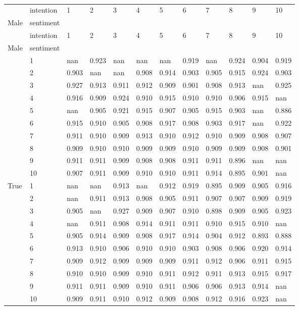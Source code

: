 \documentclass[
  letterpaper,
  DIV=11,
  numbers=noendperiod]{scrartcl}
\begin{document}
\begin{longtable}[]{@{}llllllllllll@{}}
\caption{}\label{T_ff72d}\tabularnewline
\toprule\noalign{}
~ & intention & 1 & 2 & 3 & 4 & 5 & 6 & 7 & 8 & 9 & 10 \\
Male & sentiment & ~ & ~ & ~ & ~ & ~ & ~ & ~ & ~ & ~ & ~ \\
\midrule\noalign{}
\endfirsthead
\toprule\noalign{}
~ & intention & 1 & 2 & 3 & 4 & 5 & 6 & 7 & 8 & 9 & 10 \\
Male & sentiment & ~ & ~ & ~ & ~ & ~ & ~ & ~ & ~ & ~ & ~ \\
\midrule\noalign{}
\endhead
\bottomrule\noalign{}
\endlastfoot
\multirow{10}{=}{False} & 1 & nan & 0.923 & nan & nan & nan & 0.919 &
nan & 0.924 & 0.904 & 0.919 \\
& 2 & 0.903 & nan & nan & 0.908 & 0.914 & 0.903 & 0.905 & 0.915 & 0.924
& 0.903 \\
& 3 & 0.927 & 0.913 & 0.911 & 0.912 & 0.909 & 0.901 & 0.908 & 0.913 &
nan & 0.925 \\
& 4 & 0.916 & 0.909 & 0.924 & 0.910 & 0.915 & 0.910 & 0.910 & 0.906 &
0.915 & nan \\
& 5 & nan & 0.905 & 0.921 & 0.915 & 0.907 & 0.905 & 0.915 & 0.903 & nan
& 0.886 \\
& 6 & 0.915 & 0.910 & 0.905 & 0.908 & 0.917 & 0.908 & 0.903 & 0.917 &
nan & 0.922 \\
& 7 & 0.911 & 0.910 & 0.909 & 0.913 & 0.910 & 0.912 & 0.910 & 0.909 &
0.908 & 0.907 \\
& 8 & 0.909 & 0.910 & 0.910 & 0.909 & 0.909 & 0.910 & 0.909 & 0.909 &
0.908 & 0.901 \\
& 9 & 0.911 & 0.911 & 0.909 & 0.908 & 0.908 & 0.911 & 0.911 & 0.896 &
nan & nan \\
& 10 & 0.907 & 0.911 & 0.909 & 0.910 & 0.910 & 0.911 & 0.914 & 0.895 &
0.901 & nan \\
\multirow{10}{=}{True} & 1 & nan & nan & 0.913 & nan & 0.912 & 0.919 &
0.895 & 0.909 & 0.905 & 0.916 \\
& 2 & nan & 0.911 & 0.913 & 0.908 & 0.905 & 0.911 & 0.907 & 0.907 &
0.909 & 0.919 \\
& 3 & 0.905 & nan & 0.927 & 0.909 & 0.907 & 0.910 & 0.898 & 0.909 &
0.905 & 0.923 \\
& 4 & nan & 0.911 & 0.908 & 0.914 & 0.911 & 0.911 & 0.910 & 0.915 &
0.910 & nan \\
& 5 & 0.905 & 0.914 & 0.909 & 0.908 & 0.917 & 0.914 & 0.904 & 0.912 &
0.893 & 0.888 \\
& 6 & 0.913 & 0.910 & 0.906 & 0.910 & 0.910 & 0.903 & 0.908 & 0.906 &
0.920 & 0.914 \\
& 7 & 0.909 & 0.912 & 0.909 & 0.909 & 0.909 & 0.911 & 0.912 & 0.906 &
0.911 & 0.915 \\
& 8 & 0.910 & 0.910 & 0.909 & 0.910 & 0.911 & 0.912 & 0.911 & 0.913 &
0.915 & 0.917 \\
& 9 & 0.911 & 0.911 & 0.909 & 0.910 & 0.911 & 0.906 & 0.906 & 0.913 &
0.914 & nan \\
& 10 & 0.909 & 0.911 & 0.910 & 0.912 & 0.909 & 0.908 & 0.912 & 0.916 &
0.923 & nan \\
\end{longtable}
\end{document}
